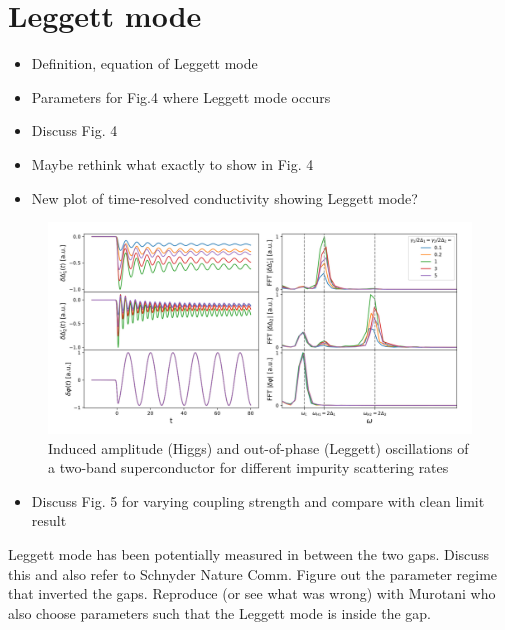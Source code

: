\documentclass[aps,prb,reprint,noeprint,superscriptaddress]{revtex4-1}
\begin{document}
\section{Leggett mode}
\label{sec:leggett_mode}

\begin{itemize}
	\item Definition, equation of Leggett mode
	\item Parameters for Fig.4 where Leggett mode occurs
	\item Discuss Fig. 4
	\item Maybe rethink what exactly to show in Fig. 4
	\item New plot of time-resolved conductivity showing Leggett mode?
\end{itemize}

\begin{figure}[H]
    \centering
    \includegraphics[width=\columnwidth]{figures/leggett_oscillations.png}
    \caption{\label{fig:leggett_oscillations}%
    Induced amplitude (Higgs) and out-of-phase (Leggett) oscillations of a two-band superconductor for different impurity scattering rates}
\end{figure}%

\begin{itemize}
	\item Discuss Fig. 5 for varying coupling strength and compare with clean limit result
\end{itemize}

Leggett mode has been potentially measured in between the two gaps. Discuss this
and also refer to Schnyder Nature Comm. Figure out the parameter regime that
inverted the gaps. Reproduce (or see what was wrong) with Murotani who also
choose parameters such that the Leggett mode is inside the gap.
\end{document}
